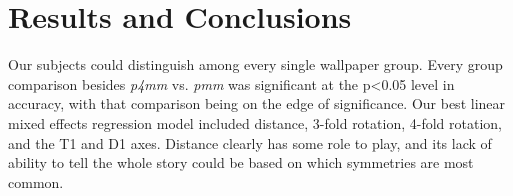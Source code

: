 \section{Results and Conclusions}
Our subjects could distinguish among every single wallpaper group. Every group comparison besides \textit{p4mm} vs. \textit{pmm} was significant at the p<0.05 level in accuracy, with that comparison being on the edge of significance. Our best linear mixed effects regression model included distance, 3-fold rotation, 4-fold rotation, and the T1 and D1 axes. Distance clearly has some role to play, and its lack of ability to tell the whole story could be based on which symmetries are most common.  


